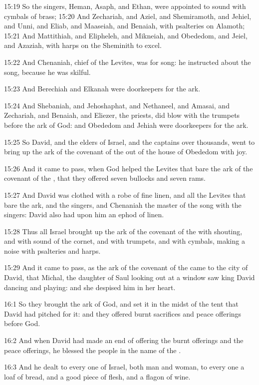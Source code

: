 15:19 So the singers, Heman, Asaph, and Ethan, were appointed to sound with cymbals of brass; 15:20 And Zechariah, and Aziel, and Shemiramoth, and Jehiel, and Unni, and Eliab, and Maaseiah, and Benaiah, with psalteries on Alamoth; 15:21 And Mattithiah, and Elipheleh, and Mikneiah, and Obededom, and Jeiel, and Azaziah, with harps on the Sheminith to excel.

15:22 And Chenaniah, chief of the Levites, was for song: he instructed about the song, because he was skilful.

15:23 And Berechiah and Elkanah were doorkeepers for the ark.

15:24 And Shebaniah, and Jehoshaphat, and Nethaneel, and Amasai, and Zechariah, and Benaiah, and Eliezer, the priests, did blow with the trumpets before the ark of God: and Obededom and Jehiah were doorkeepers for the ark.

15:25 So David, and the elders of Israel, and the captains over thousands, went to bring up the ark of the covenant of the \LORD out of the house of Obededom with joy.

15:26 And it came to pass, when God helped the Levites that bare the ark of the covenant of the \LORD, that they offered seven bullocks and seven rams.

15:27 And David was clothed with a robe of fine linen, and all the Levites that bare the ark, and the singers, and Chenaniah the master of the song with the singers: David also had upon him an ephod of linen.

15:28 Thus all Israel brought up the ark of the covenant of the \LORD with shouting, and with sound of the cornet, and with trumpets, and with cymbals, making a noise with psalteries and harps.

15:29 And it came to pass, as the ark of the covenant of the \LORD came to the city of David, that Michal, the daughter of Saul looking out at a window saw king David dancing and playing: and she despised him in her heart.

16:1 So they brought the ark of God, and set it in the midst of the tent that David had pitched for it: and they offered burnt sacrifices and peace offerings before God.

16:2 And when David had made an end of offering the burnt offerings and the peace offerings, he blessed the people in the name of the \LORD.

16:3 And he dealt to every one of Israel, both man and woman, to every one a loaf of bread, and a good piece of flesh, and a flagon of wine.

